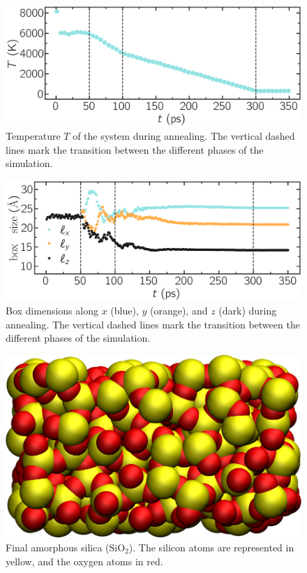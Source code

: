 \documentclass[9pt,tutorial]{livecoms}
\begin{document}
\begin{figure}
\centering
\includegraphics[width=\linewidth]{GCMC-temperature}
\caption{Temperature $T$ of the system during annealing. The vertical dashed lines
mark the transition between the different phases of the simulation.}
\label{fig:GCMC-temperature}
\end{figure}

\begin{figure}
\centering
\includegraphics[width=\linewidth]{GCMC-dimension}
\caption{Box dimensions along $x$ (blue), $y$ (orange), and $z$ (dark) during
annealing. The vertical dashed lines mark the transition between the different
phases of the simulation.}
\label{fig:GCMC-dimension}
\end{figure}

\begin{figure}
\centering
\includegraphics[width=0.9\linewidth]{GCMC-snapshot}
\caption{Final amorphous silica ($\text{SiO}_2$). The silicon atoms are
represented in yellow, and the oxygen atoms in red.}
\label{fig:GCMC-snapshot}
\end{figure}
\end{document}
